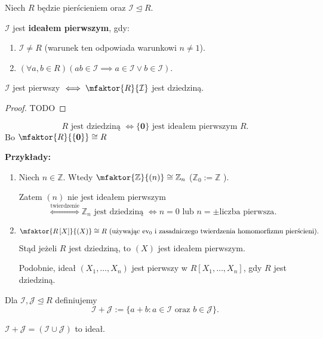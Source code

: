 Niech $R$ będzie pierścieniem oraz $\mathcal{I}\unlhd R$.
\begin{definition}
	$\mathcal{I}$ jest \textbf{ideałem pierwszym}, gdy:
	\begin{enumerate}[label=\arabic*)]
		\item $\mathcal{I}\neq R$ (warunek ten odpowiada warunkowi $n\neq 1$).
		\item $\left(\forall a,b \in R \right)\left( ab \in \mathcal{I}\implies a\in \mathcal{I} \lor b \in \mathcal{I} \right)  $.
	\end{enumerate}
\end{definition} 
\begin{theorem} 
	$\mathcal{I}$ jest pierwszy $\iff \mfaktor{R}{\mathcal{I}} $ jest dziedziną.
\end{theorem} 
\begin{proof}
	TODO
\end{proof} 
\begin{corollary}
	\[
	R \text{ jest dziedziną }\iff \{\mathbf{0}\} \text{ jest ideałem pierwszym }R
	.\] 
	Bo $\mfaktor{R}{\{\mathbf{0}\} } \cong R$
\end{corollary}
\noindent \textbf{Przykłady:}
\begin{enumerate}[label=\arabic*)]
	\item Niech $n\in \mathbb{Z} $. Wtedy $\mfaktor{\mathbb{Z} }{\left( n \right) } \cong \mathbb{Z} _{n} $ ($\mathbb{Z} _{0}:= \mathbb{Z} $ ).

	Zatem $\left( n \right) $ nie jest ideałem pierwszym \[\overset{\text{twierdzenie}}{\iff } \mathbb{Z} _{n} \text{ jest dziedziną } \iff n=0 \text{ lub } n = \pm\text{liczba pierwsza}.\]
	\item \[
	\mfaktor{R\left[ X \right] }{\left( X \right) }  \cong R \text{ (używając ev$_{0}$ i zasadniczego twierdzenia homomorfizmu pierścieni)}
	.\]  
	Stąd jeżeli $R$ jest dziedziną, to $\left( X \right) $ jest ideałem pierwszym.

	Podobnie, ideał $\left( X_1,\ldots,X_{n}  \right) $ jest pierwszy w $R\left[ X_1,\ldots,X_{n}  \right] $, gdy $R$ jest dziedziną. 
\end{enumerate}
\begin{definition}
	Dla $\mathcal{I},\mathcal{J} \unlhd R$ definiujemy
	\[
	\mathcal{I} + \mathcal{J} := \{a + b : a\in \mathcal{I}\text{ oraz } b \in  \mathcal{J}\} 
	.\] 
\begin{remark}
	$\mathcal{I}+ \mathcal{J} = \left( \mathcal{I}\cup \mathcal{J} \right) $ to ideał.
\end{remark} 
\end{definition} 
